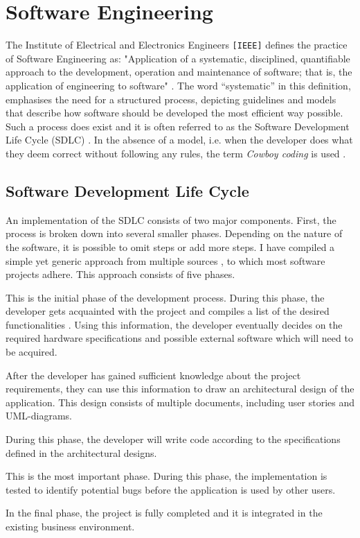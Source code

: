 \chapter{Software Engineering}
The Institute of Electrical and Electronics Engineers \texttt{[IEEE]} defines the practice of Software Engineering as: "Application of a systematic, disciplined, quantifiable approach to the development, operation and maintenance of software; that is, the application of engineering to software" \cite[p.~421]{8016712}. The word ``systematic'' in this definition, emphasises the need for a structured process, depicting guidelines and models that describe how software should be developed the most efficient way possible. Such a process does exist and it is often referred to as the Software Development Life Cycle (SDLC) \cite[p.~420]{8016712}. In the absence of a model, i.e. when the developer does what they deem correct without following any rules, the term \emph{Cowboy coding} is used \cite[p.~34]{landry2011iterative}.

\section{Software Development Life Cycle}
An implementation of the SDLC consists of two major components. First, the process is broken down into several smaller phases. Depending on the nature of the software, it is possible to omit steps or add more steps. I have compiled a simple yet generic approach from multiple sources \cite{2010govardhan} \cite{7106435}, to which most software projects adhere. This approach consists of five phases.
\begin{enumerate}
	 This is the initial phase of the development process. During this phase, the developer gets acquainted with the project and compiles a list of the desired functionalities \cite{7106435}. Using this information, the developer eventually decides on the required hardware specifications and possible external software which will need to be acquired.
	
	 After the developer has gained sufficient knowledge about the project requirements, they can use this information to draw an architectural design of the application. This design consists of multiple documents, including user stories and UML-diagrams.
	
	 During this phase, the developer will write code according to the specifications defined in the architectural designs.
	
	 This is the most important phase. During this phase, the implementation is tested to identify potential bugs before the application is used by other users.
	
	 In the final phase, the project is fully completed and it is integrated in the existing business environment.
\end{enumerate}

